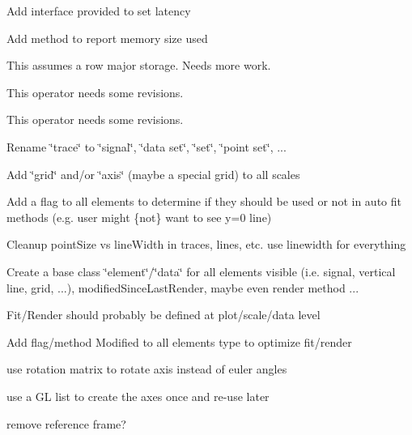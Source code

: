 \begin{DoxyRefList}
Add interface provided to set latency 

Add method to report memory size used  
\item[\label{todo__todo000001}%
\hypertarget{todo__todo000001}{}%
Member \hyperlink{classvct_dynamic_matrix_ac0062998c00df7a4e5155c3eac8fddb0}{vct\+Dynamic\+Matrix$<$ \+\_\+element\+Type $>$\+:\+:operator=} (const vct\+Dynamic\+Const\+Matrix\+Base$<$ \+\_\+\+\_\+matrix\+Owner\+Type, \+\_\+\+\_\+element\+Type $>$ \&other\+Matrix)]This assumes a row major storage. Needs more work.  
\item[\label{todo__todo000002}%
\hypertarget{todo__todo000002}{}%
Member \hyperlink{classvct_dynamic_matrix_a8c20bdf6d0df4b4271cb970dd8f225bd}{vct\+Dynamic\+Matrix$<$ \+\_\+element\+Type $>$\+:\+:operator=} (const vct\+Return\+Dynamic\+Matrix$<$ value\+\_\+type $>$ \&other\+Matrix)]This operator needs some revisions.  
\item[\label{todo__todo000003}%
\hypertarget{todo__todo000003}{}%
Member \hyperlink{classvct_dynamic_n_array_a46790594f24b17dd1f5c808210cf36c8}{vct\+Dynamic\+N\+Array$<$ \+\_\+element\+Type, \+\_\+dimension $>$\+:\+:operator=} (const vct\+Return\+Dynamic\+N\+Array$<$ value\+\_\+type, \+\_\+dimension $>$ \&other\+N\+Array)]This operator needs some revisions.  
\item[\label{todo__todo000004}%
\hypertarget{todo__todo000004}{}%
Class \hyperlink{classvct_plot2_d_base}{vct\+Plot2\+D\+Base} ]Rename \char`\"{}trace\char`\"{} to \char`\"{}signal\char`\"{}, \char`\"{}data set\char`\"{}, \char`\"{}set\char`\"{}, \char`\"{}point set\char`\"{}, ... 

Add \char`\"{}grid\char`\"{} and/or \char`\"{}axis\char`\"{} (maybe a special grid) to all scales 

Add a flag to all elements to determine if they should be used or not in auto fit methods (e.\+g. user might \{not\} want to see y=0 line) 

Cleanup point\+Size vs line\+Width in traces, lines, etc. use linewidth for everything 

Create a base class \char`\"{}element\char`\"{}/\char`\"{}data\char`\"{} for all elements visible (i.\+e. signal, vertical line, grid, ...), modified\+Since\+Last\+Render, maybe even render method ... 

Fit/\+Render should probably be defined at plot/scale/data level 

Add flag/method Modified to all elements type to optimize fit/render  
\item[\label{todo__todo000005}%
\hypertarget{todo__todo000005}{}%
Class \hyperlink{classvct_qt_widget_rotation_open_g_l}{vct\+Qt\+Widget\+Rotation\+Open\+G\+L} ]use rotation matrix to rotate axis instead of euler angles 

use a G\+L list to create the axes once and re-\/use later 

remove reference frame? 
\end{DoxyRefList}